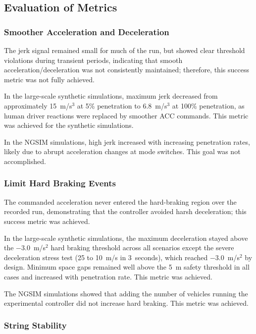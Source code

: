 \documentclass[conference]{IEEEtran}
\begin{document}
\subsection{Evaluation of Metrics}

\subsubsection{Smoother Acceleration and Deceleration}

The jerk signal remained small for much of the run, but showed clear threshold violations during transient periods, indicating that smooth acceleration/deceleration was not consistently maintained; therefore, this success metric was not fully achieved.

In the large-scale synthetic simulations, maximum jerk decreased from approximately 15~m/s$^3$ at 5\% penetration to 6.8~m/s$^3$ at 100\% penetration, as human driver reactions were replaced by smoother ACC commands. This metric was achieved for the synthetic simulations.

In the NGSIM simulations, high jerk increased with increasing penetration rates, likely due to abrupt acceleration changes at mode switches. This goal was not accomplished.

\subsubsection{Limit Hard Braking Events}

The commanded acceleration never entered the hard-braking region over the recorded run, demonstrating that the controller avoided harsh deceleration; this success metric was achieved.


In the large-scale synthetic simulations, the maximum deceleration stayed above the $-3.0$~m/s$^2$ hard braking threshold across all scenarios except the severe deceleration stress test (25 to 10~m/s in 3~seconds), which reached $-3.0$~m/s$^2$ by design. Minimum space gaps remained well above the 5~m safety threshold in all cases and increased with penetration rate. This metric was achieved.

The NGSIM simulations showed that adding the number of vehicles running the experimental controller did not increase hard braking. This metric was achieved.

\subsubsection{String Stability}
\end{document}
